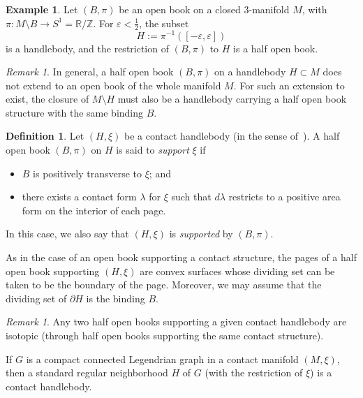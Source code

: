 \documentclass{amsart}
\numberwithin{equation}{section}
\numberwithin{figure}{section}
\theoremstyle{definition}
\newtheorem{definition}[theorem]{Definition}
\newtheorem{example}[theorem]{Example}
\theoremstyle{remark}
\newtheorem{remark}[theorem]{Remark}
\newcommand{\R}{\mathbb{R}}
\newcommand{\Z}{\mathbb{Z}}
\let\olddxi\xi %
\renewcommand{\xi}{\olddxi}
\begin{document}
\begin{example}
  Let $(B,\pi)$ be an open book on a closed $3$-manifold $M$, with $\pi\colon M\setminus B\to S^1=\R/\Z$. For $\varepsilon<\tfrac{1}{2}$, the subset
  \[
    H := \pi^{-1}([-\varepsilon,\varepsilon])
  \]
  is a handlebody, and the restriction of $(B,\pi)$ to $H$ is a half open book.
\end{example}

\begin{remark}
  In general, a half open book $(B,\pi)$ on a handlebody $H\subset M$ does not extend to an open book of the whole manifold $M$. For such an extension to exist, the closure of $M\setminus H$ must also be a handlebody carrying a half open book structure with the same binding $B$.
\end{remark}

\begin{definition}
  Let $(H,\xi)$ be a contact handlebody (in the sense of~\cite{Giroux91}). A half open book $(B,\pi)$ on $H$ is said to \emph{support} $\xi$ if
  \begin{itemize}
    \item $B$ is positively transverse to $\xi$; and
    \item there exists a contact form $\lambda$ for $\xi$ such that $d\lambda$ restricts to a positive area form on the interior of each page.
  \end{itemize}
  In this case, we also say that $(H,\xi)$ is \emph{supported} by $(B,\pi)$.
\end{definition}

As in the case of an open book supporting a contact structure, the pages of a half open book supporting $(H,\xi)$ are convex surfaces whose dividing set can be taken to be the boundary of the page. Moreover, we may assume that the dividing set of $\partial H$ is the binding $B$.

\begin{remark}
  Any two half open books supporting a given contact handlebody are isotopic (through half open books supporting the same contact structure).
\end{remark}

If $G$ is a compact connected Legendrian graph in a contact manifold $(M,\xi)$, then a standard regular neighborhood $H$ of $G$ (with the restriction of $\xi$) is a contact handlebody.
\end{document}
